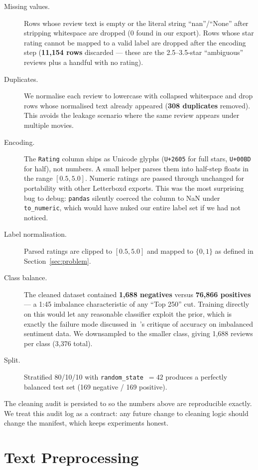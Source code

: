 \documentclass[11pt]{article}
\begin{document}
\begin{description}
  \item[Missing values.] Rows whose review text is empty or the literal string ``nan''/``None'' after stripping whitespace are dropped (0 found in our export). Rows whose star rating cannot be mapped to a valid label are dropped after the encoding step (\textbf{11{,}154 rows} discarded --- these are the 2.5--3.5-star ``ambiguous'' reviews plus a handful with no rating).
  \item[Duplicates.] We normalise each review to lowercase with collapsed whitespace and drop rows whose normalised text already appeared (\textbf{308 duplicates} removed). This avoids the leakage scenario where the same review appears under multiple movies.
  \item[Encoding.] The \texttt{Rating} column ships as Unicode glyphs (\texttt{U+2605} for full stars, \texttt{U+00BD} for half), not numbers. A small helper parses them into half-step floats in the range $[0.5, 5.0]$. Numeric ratings are passed through unchanged for portability with other Letterboxd exports. This was the most surprising bug to debug: \texttt{pandas} silently coerced the column to NaN under \texttt{to\_numeric}, which would have nuked our entire label set if we had not noticed.
  \item[Label normalisation.] Parsed ratings are clipped to $[0.5, 5.0]$ and mapped to $\{0, 1\}$ as defined in Section~\ref{sec:problem}.
  \item[Class balance.] The cleaned dataset contained \textbf{1{,}688 negatives} versus \textbf{76{,}866 positives} --- a 1{:}45 imbalance characteristic of any ``Top 250'' cut. Training directly on this would let any reasonable classifier exploit the prior, which is exactly the failure mode discussed in~\citet{pang_lee_2008}'s critique of accuracy on imbalanced sentiment data. We downsampled to the smaller class, giving 1{,}688 reviews per class (3{,}376 total).
  \item[Split.] Stratified 80/10/10 with \texttt{random\_state}~$=42$ produces a perfectly balanced test set (169 negative / 169 positive).
\end{description}

The cleaning audit is persisted to  so the numbers above are reproducible exactly. We treat this audit log as a contract: any future change to cleaning logic should change the manifest, which keeps experiments honest.

\section{Text Preprocessing}
\label{sec:preprocess}
\end{document}
